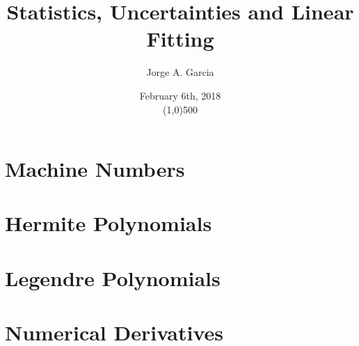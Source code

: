 \documentclass[twocolumn]{article}
\title{Statistics, Uncertainties and Linear Fitting}
\author{Jorge A. Garcia}
\date{February 6th, 2018\\\line(1,0){500}}
\begin{document}
\maketitle

\section{Machine Numbers}

\section{Hermite Polynomials}



\section{Legendre Polynomials}

\section{Numerical Derivatives}
\end{document}
